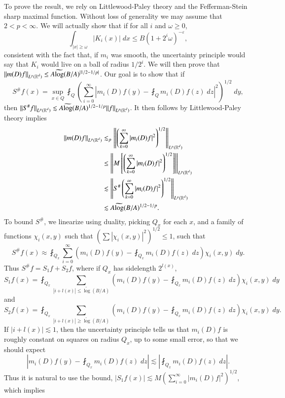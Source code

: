 To prove the result, we rely on Littlewood-Paley theory and the Fefferman-Stein sharp maximal function. Without loss of generality we may assume that $2 < p < \infty$. We will actually show that if for all $i$ and $\omega \geq 0$,
%
\[ \int_{|x| \geq \omega} |K_i(x)|\; dx \leq B (1 + 2^i \omega)^{-\varepsilon}, \]
%
consistent with the fact that, if $m_i$ was smooth, the uncertainty principle would say that $K_i$ would live on a ball of radius $1/2^i$. We will then prove that $\| m(D) f \|_{L^p(\operatorname{\mathbb{R}}^d)} \leq A \widetilde{\log}(B/A)^{|1/2 - 1/p|}$. Our goal is to show that if
%
\[ S^\# f(x) = \sup_{x \in Q} \fint_Q \left( \sum_{i = 0}^\infty \left| m_i(D) f(y) - \fint_Q m_i(D) f(z)\; dz \right|^2 \right)^{1/2}\; dy, \]
%
then $\| S^\# f \|_{L^p(\operatorname{\mathbb{R}}^d)} \lesssim A \widetilde{\log}(B/A)^{1/2 - 1/p} \| f \|_{L^p(\operatorname{\mathbb{R}}^d)}$. It then follows by Littlewood-Paley theory implies
%
\begin{align*}
    \| m(D) f \|_{L^p(\operatorname{\mathbb{R}}^d)} &\lesssim_p \left\| \left( \sum_{k = 0}^\infty |m_i(D) f|^2 \right)^{1/2} \right\|_{L^p(\operatorname{\mathbb{R}}^d)}\\
    &\leq \left\| M \left[ \left( \sum_{k = 0}^\infty |m_i(D) f|^2 \right)^{1/2} \right] \right\|_{L^p(\operatorname{\mathbb{R}}^d)}\\
    &\lesssim \left\| S^\# \left( \sum_{k = 0}^\infty |m_i(D) f|^2 \right)^{1/2} \right\|_{L^p(\operatorname{\mathbb{R}}^d)}\\
    &\lesssim A \widetilde{\log}(B/A)^{1/2 - 1/p}.
\end{align*}
%
To bound $S^\#$, we linearize using duality, picking $Q_x$ for each $x$, and a family of functions $\chi_i(x,y)$ such that $\left( \sum |\chi_i(x,y)|^2 \right)^{1/2} \leq 1$, such that
%
\[ S^\# f(x) \approx \fint_{Q_x} \sum_{i = 0}^\infty \left( m_i(D) f(y) - \fint_{Q_x} m_i(D) f(z)\; dz \right) \chi_i(x,y)\; dy. \]
%
Thus $S^\# f = S_1 f + S_2 f$, where if $Q_x$ has sidelength $2^{l(x)}$,
%
\[ S_1 f(x) = \fint_{Q_x} \sum_{|i + l(x)| \leq \tilde\log(B/A)} \left( m_i(D) f(y) - \fint_{Q_x} m_i(D) f(z)\; dz \right) \chi_i(x,y)\; dy \]
%
and
%
\[ S_2 f(x) = \fint_{Q_x} \sum_{|i + l(x)| \geq \tilde\log(B/A)} \left( m_i(D) f(y) - \fint_{Q_x} m_i(D) f(z)\; dz \right) \chi_i(x,y)\; dy. \]
%
If $|i + l(x)| \lesssim 1$, then the uncertainty principle tells us that $m_i(D) f$ is roughly constant on squares on radius $Q_x$, up to some small error, so that we should expect
%
\[ \left| m_i(D) f(y) - \fint_{Q_x} m_i(D) f(z)\; dz \right| \lesssim \left| \fint_{Q_x} m_i(D) f(z)\; dz \right|. \]
%
Thus it is natural to use the bound, $|S_1 f(x)| \lesssim M(\sum_{i = 0}^\infty |m_i(D) f|^2)^{1/2}$, which implies
